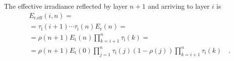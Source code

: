 \documentclass[a4paper,10pt,twocolumn,\classoptions]{article}
\begin{document}
The effective irradiance reflected by layer $n + 1$ and arriving to layer $i$ is
\begin{equation}
  \label{eq:irradiance_reflected_effective}
  \begin{split}
  & E_{\text{r},\text{eff}}(i, n) = \\
  & = \tau_\text{i}(i + 1) \cdots \tau_\text{i}(n) E_\text{r}(n) = \\
  & = \rho(n + 1) E_\text{t}(n) \prod_{k = i + 1}^{n} \tau_\text{i}(k) = \\
  & = \rho(n + 1) E_\text{t}(0) \prod_{j = 1}^{n} \tau_\text{i}(j) (1 - \rho(j)) \prod_{k = i + 1}^{n} \tau_\text{i}(k)
  \quad .
  \end{split}
\end{equation}
\end{document}
